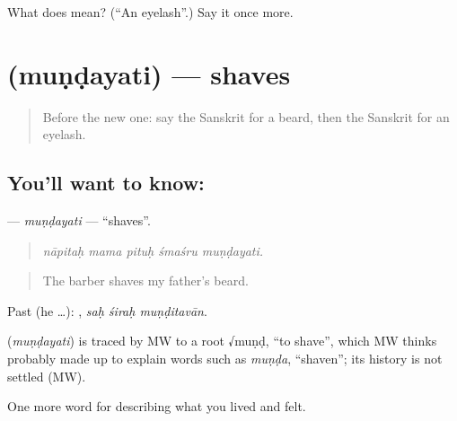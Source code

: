 \begin{tcolorbox}[breakable,colback=teal!4,colframe=teal!35!black,title={Before you move on}]
What does  mean? (\textquotedblleft{}An eyelash\textquotedblright{}.) Say it once more.
\end{tcolorbox}
\section[\texorpdfstring{\sk{मुण्डयति} (muṇḍayati)}{मुण्डयति (muṇḍayati)}]{ (muṇḍayati) — shaves}

\label{lesson:SA-C471-mundayati}



\begin{quote}
Before the new one: say the Sanskrit for a beard, then the Sanskrit for an eyelash.
\end{quote}

\subsection*{You'll want to know: }
\textbf{} — \emph{muṇḍayati} — \textquotedblleft{}shaves\textquotedblright{}.

\begin{quote}
    
\end{quote}

\begin{quote}
\emph{nāpitaḥ mama pituḥ śmaśru muṇḍayati.}
\end{quote}

\begin{quote}
The barber shaves my father's beard.
\end{quote}

Past (he …):   , \emph{saḥ śiraḥ muṇḍitavān}.

\begin{cousinweb}
\textbf{} (\emph{muṇḍayati}) is traced by MW to a root √muṇḍ, \textquotedblleft{}to shave\textquotedblright{}, which MW thinks probably made up to explain words such as \emph{muṇḍa}, \textquotedblleft{}shaven\textquotedblright{}; its history is not settled (MW).
\end{cousinweb}

\begin{grammarlens}[title={What you've built}]
One more word for describing what you lived and felt.
\end{grammarlens}

